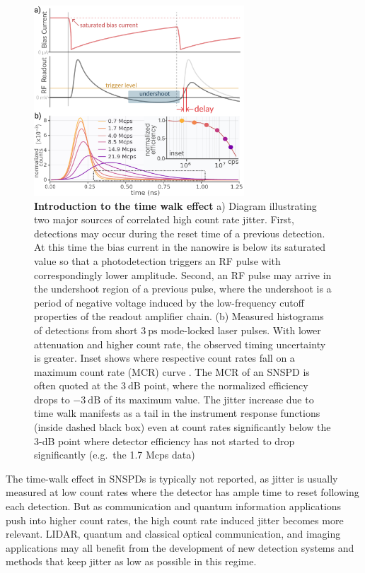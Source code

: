 \documentclass[11pt]{caltech_thesis} %
\begin{document}
\hypertarget{fig:jitterate_intro}{%
\begin{figure}
\centering
\includegraphics[width=0.7\textwidth,height=\textheight]{./chapter_03/figs/intro_jitterate_light.pdf}
\caption[{Introduction to the time walk effect}]{\textbf{Introduction to the time walk effect} a) Diagram illustrating two major sources of correlated high count rate jitter. First, detections may occur during the reset time of a previous detection. At this time the bias current in the nanowire is below its saturated value so that a photodetection triggers an RF pulse with correspondingly lower amplitude. Second, an RF pulse may arrive in the undershoot region of a previous pulse, where the undershoot is a period of negative voltage induced by the low-frequency cutoff properties of the readout amplifier chain. (b) Measured histograms of detections from short $3~\mathrm{ps}$ mode-locked laser pulses. With lower attenuation and higher count rate, the observed timing uncertainty is greater. Inset shows where respective count rates fall on a maximum count rate (MCR) curve \autocite{Zhang_MCR_2019}. The MCR of an SNSPD is often quoted at the $3~\mathrm{dB}$ point, where the normalized efficiency drops to $-3~\mathrm{dB}$ of its maximum value. The jitter increase due to time walk manifests as a tail in the instrument response functions (inside dashed black box) even at count rates significantly below the 3-dB point where detector efficiency has not started to drop significantly (e.g.~the 1.7 Mcps data)}
\label{fig:jitterate_intro}
\end{figure}
}

The time-walk effect in SNSPDs is typically not reported, as jitter is usually measured at low count rates where the detector has ample time to reset following each detection. But as communication and quantum information applications push into higher count rates, the high count rate induced jitter becomes more relevant. LIDAR, quantum and classical optical communication, and imaging applications may all benefit from the development of new detection systems and methods that keep jitter as low as possible in this regime.
\end{document}
